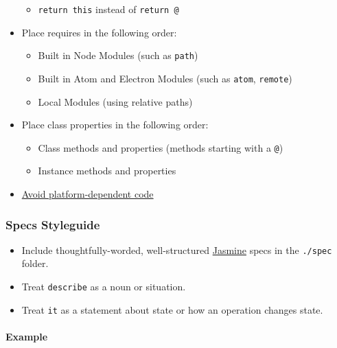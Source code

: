 \begin{itemize}
  \begin{itemize}
  \tightlist
  \item
    \texttt{return\ this} instead of \texttt{return\ @}
  \end{itemize}
\item
  Place requires in the following order:

  \begin{itemize}
  \tightlist
  \item
    Built in Node Modules (such as \texttt{path})
  \item
    Built in Atom and Electron Modules (such as \texttt{atom},
    \texttt{remote})
  \item
    Local Modules (using relative paths)
  \end{itemize}
\item
  Place class properties in the following order:

  \begin{itemize}
  \tightlist
  \item
    Class methods and properties (methods starting with a \texttt{@})
  \item
    Instance methods and properties
  \end{itemize}
\item
  \href{https://flight-manual.atom.io/hacking-atom/sections/cross-platform-compatibility/}{Avoid
  platform-dependent code}
\end{itemize}

\hypertarget{specs-styleguide}{%
\subsubsection{Specs Styleguide}\label{specs-styleguide}}

\begin{itemize}
\tightlist
\item
  Include thoughtfully-worded, well-structured
  \href{https://jasmine.github.io/}{Jasmine} specs in the
  \texttt{./spec} folder.
\item
  Treat \texttt{describe} as a noun or situation.
\item
  Treat \texttt{it} as a statement about state or how an operation
  changes state.
\end{itemize}

\hypertarget{example}{%
\paragraph{Example}\label{example}}

